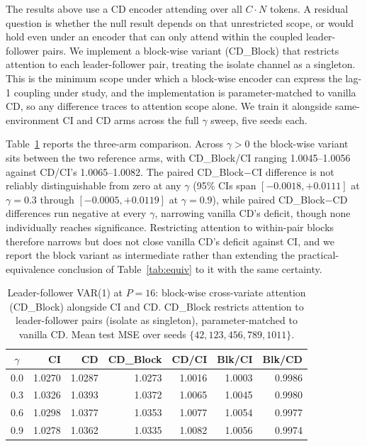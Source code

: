 \documentclass[10pt]{article} %
\begin{document}
    The results above use a CD encoder attending over all $C\cdot N$ tokens. A residual question is whether the null result
    depends on that unrestricted scope, or would hold even under an encoder that can only attend within the coupled
    leader-follower pairs. We implement a block-wise variant (CD\_Block) that restricts attention to each leader-follower pair,
    treating the isolate channel as a singleton. This is the minimum scope under which a block-wise encoder can express the
    lag-1 coupling under study, and the implementation is parameter-matched to vanilla CD, so any difference traces to
    attention scope alone. We train it alongside same-environment CI and CD arms across the full $\gamma$ sweep, five seeds each.

    Table~\ref{tab:block_attn} reports the three-arm comparison. Across $\gamma > 0$ the block-wise variant sits
    between the two reference arms, with CD\_Block/CI ranging 1.0045--1.0056 against CD/CI's 1.0065--1.0082. The paired
    CD\_Block$-$CI difference is not reliably distinguishable from zero at any $\gamma$ (95\% CIs span
    $[-0.0018,+0.0111]$ at $\gamma=0.3$ through $[-0.0005,+0.0119]$ at $\gamma=0.9$), while paired CD\_Block$-$CD
    differences run negative at every $\gamma$, narrowing vanilla CD's deficit, though none individually reaches
    significance. Restricting attention to within-pair blocks therefore narrows but does not close vanilla CD's
    deficit against CI, and we report the block variant as intermediate rather than extending the practical-equivalence
    conclusion of Table~\ref{tab:equiv} to it with the same certainty.


    \begin{table}[htbp]
        \centering
        \caption{Leader-follower VAR(1) at $P = 16$: block-wise cross-variate attention (CD\_Block) alongside CI and
            CD. CD\_Block restricts attention to leader-follower pairs (isolate as singleton), parameter-matched to
            vanilla CD. Mean test MSE over seeds $\{42, 123, 456, 789, 1011\}$.}
        \label{tab:block_attn}
        \begin{tabular}{crrrrrr}
            \toprule
            $\gamma$ & CI     & CD     & CD\_Block & CD/CI  & Blk/CI & Blk/CD \\
            \midrule
            0.0      & 1.0270 & 1.0287 & 1.0273    & 1.0016 & 1.0003 & 0.9986 \\
            0.3      & 1.0326 & 1.0393 & 1.0372    & 1.0065 & 1.0045 & 0.9980 \\
            0.6      & 1.0298 & 1.0377 & 1.0353    & 1.0077 & 1.0054 & 0.9977 \\
            0.9      & 1.0278 & 1.0362 & 1.0335    & 1.0082 & 1.0056 & 0.9974 \\
            \bottomrule
        \end{tabular}
    \end{table}
\end{document}
